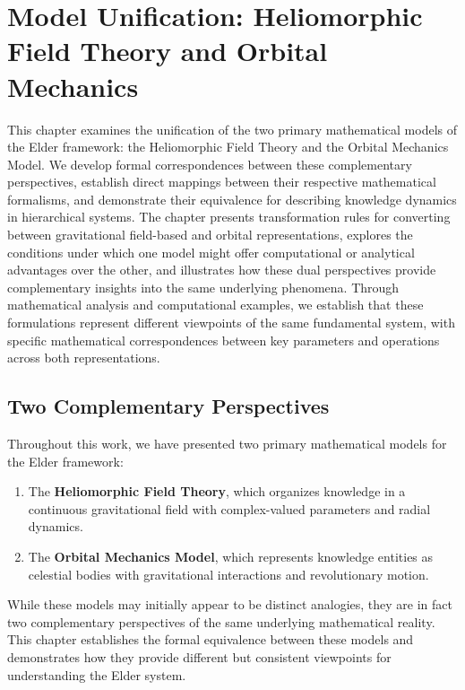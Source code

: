 \chapter{Model Unification: Heliomorphic Field Theory and Orbital Mechanics}

\begin{tcolorbox}[colback=DarkSkyBlue!5!white,colframe=DarkSkyBlue!75!black,title=Chapter Summary]
This chapter examines the unification of the two primary mathematical models of the Elder framework: the Heliomorphic Field Theory and the Orbital Mechanics Model. We develop formal correspondences between these complementary perspectives, establish direct mappings between their respective mathematical formalisms, and demonstrate their equivalence for describing knowledge dynamics in hierarchical systems. The chapter presents transformation rules for converting between gravitational field-based and orbital representations, explores the conditions under which one model might offer computational or analytical advantages over the other, and illustrates how these dual perspectives provide complementary insights into the same underlying phenomena. Through mathematical analysis and computational examples, we establish that these formulations represent different viewpoints of the same fundamental system, with specific mathematical correspondences between key parameters and operations across both representations.
\end{tcolorbox}

\section{Two Complementary Perspectives}

Throughout this work, we have presented two primary mathematical models for the Elder framework:

\begin{enumerate}
    \item The \textbf{Heliomorphic Field Theory}, which organizes knowledge in a continuous gravitational field with complex-valued parameters and radial dynamics.
    
    \item The \textbf{Orbital Mechanics Model}, which represents knowledge entities as celestial bodies with gravitational interactions and revolutionary motion.
\end{enumerate}

While these models may initially appear to be distinct analogies, they are in fact two complementary perspectives of the same underlying mathematical reality. This chapter establishes the formal equivalence between these models and demonstrates how they provide different but consistent viewpoints for understanding the Elder system.

